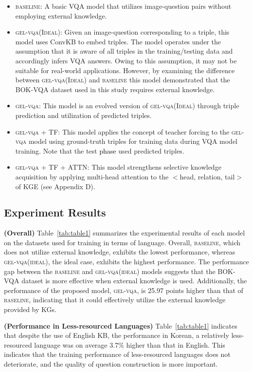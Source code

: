\documentclass[letterpaper]{article} %
\newcommand{\kt}[1]{\textcolor{black}{#1}}
\begin{document}
\begin{itemize}
\item \textsc{baseline}: A basic VQA model that utilizes image-question pairs without employing external knowledge.
\item \textsc{gel-vqa(Ideal)}: Given an image-question corresponding to a triple, this model uses ConvKB to embed triples. The model operates under the assumption that it is aware of all triples in the training/testing data and accordingly infers VQA answers. Owing to this assumption, it may not be suitable for real-world applications. However, by examining the difference between \textsc{gel-vqa(Ideal)} and \textsc{baseline} this model demonstrated that the BOK-VQA dataset used in this study requires external knowledge.
\item \textsc{gel-vqa}: This model is an evolved version of \textsc{gel-vqa(Ideal)} through triple prediction and utilization of predicted triples.
\item \textsc{gel-vqa} + TF: This model applies the concept of teacher forcing to the \textsc{gel-vqa} model using ground-truth triples for training data during VQA model training. Note that the test \kt{phase} used predicted triples.
\item \textsc{gel-vqa} + TF + ATTN:  This model strengthens selective knowledge acquisition by applying multi-head attention to the $<$head, relation, tail$>$ of KGE (see Appendix D).
\end{itemize}



\subsection{Experiment Results}
\textbf{(Overall)} Table~\ref{tab:table1} summarizes the experimental results of each model on the datasets used for training in terms of language. Overall, \textsc{baseline}, which does not utilize external knowledge, exhibits the lowest performance, whereas \textsc{gel-vqa(ideal)}, the ideal case, exhibits the highest performance. The performance gap between the \textsc{baseline} and \textsc{gel-vqa(ideal)} models suggests that the BOK-VQA dataset is more effective when external knowledge is used. Additionally, the performance of the proposed model, \textsc{gel-vqa}, is 25.97 points higher than that of \textsc{baseline}, indicating that it could effectively utilize the external knowledge provided by KGs.

\noindent \textbf{(Performance in Less-resourced Languages)} Table~\ref{tab:table1} indicates that despite the use of English KB, the performance in Korean, a relatively less-resourced language was on average 3.7\% higher than that in English. This indicates that the training performance of less-resourced languages does not deteriorate, and the quality of question construction is more important.
\end{document}

